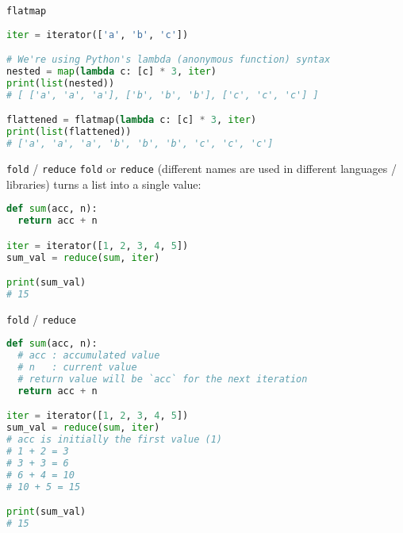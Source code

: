 \documentclass[../index.tex]{subfiles}
\begin{document}
\renewcommand{\currenttitle}{\texttt{flatmap}}
\begin{frame}[fragile]{\currenttitle}

  \begin{lstlisting}[language=Python]
iter = iterator(['a', 'b', 'c'])

# We're using Python's lambda (anonymous function) syntax
nested = map(lambda c: [c] * 3, iter)
print(list(nested))
# [ ['a', 'a', 'a'], ['b', 'b', 'b'], ['c', 'c', 'c'] ]

flattened = flatmap(lambda c: [c] * 3, iter)
print(list(flattened))
# ['a', 'a', 'a', 'b', 'b', 'b', 'c', 'c', 'c']
  \end{lstlisting}
\end{frame}

\renewcommand{\currenttitle}{\texttt{fold} / \texttt{reduce}}
\begin{frame}[fragile]{\currenttitle}
  \texttt{fold} or \texttt{reduce} (different names are used in different
  languages / libraries) turns a list into a single value: \\[1em]

  \begin{lstlisting}[language=Python]
def sum(acc, n):
  return acc + n

iter = iterator([1, 2, 3, 4, 5])
sum_val = reduce(sum, iter)

print(sum_val)
# 15
  \end{lstlisting}
\end{frame}

\begin{frame}[fragile]{\currenttitle}
  \vspace*{1em}
  \begin{lstlisting}[language=Python]
def sum(acc, n):
  # acc : accumulated value
  # n   : current value 
  # return value will be `acc` for the next iteration
  return acc + n

iter = iterator([1, 2, 3, 4, 5])
sum_val = reduce(sum, iter)
# acc is initially the first value (1)
# 1 + 2 = 3
# 3 + 3 = 6
# 6 + 4 = 10
# 10 + 5 = 15

print(sum_val)
# 15
  \end{lstlisting}
\end{frame}
\end{document}
